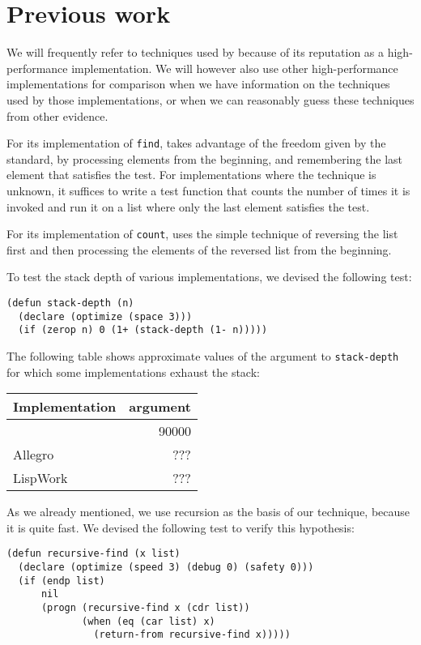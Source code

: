 \section{Previous work}

We will frequently refer to techniques used by \sbcl{} because of its
reputation as a high-performance implementation.  We will however also
use other high-performance implementations for comparison when we have
information on the techniques used by those implementations, or when
we can reasonably guess these techniques from other evidence.

For its implementation of \texttt{find}, \sbcl{} takes advantage of
the freedom given by the standard, by processing elements from the
beginning, and remembering the last element that satisfies the test.
For implementations where the technique is unknown, it suffices to
write a test function that counts the number of times it is invoked
and run it on a list where only the last element satisfies the test.

For its implementation of \texttt{count}, \sbcl{} uses the simple
technique of reversing the list first and then processing the elements
of the reversed list from the beginning.

To test the stack depth of various implementations, we devised the
following test:

{\small\begin{verbatim}
(defun stack-depth (n)
  (declare (optimize (space 3)))
  (if (zerop n) 0 (1+ (stack-depth (1- n)))))
\end{verbatim}}

The following table shows approximate values of the argument to
\texttt{stack-depth} for which some implementations exhaust the stack:


\begin{tabular}{|l|r|}
\hline
Implementation & argument\\
\hline
\hline
\sbcl{} & 90000\\
\hline
Allegro & ???\\
\hline
LispWork & ???\\
\hline
\end{tabular}

As we already mentioned, we use recursion as the basis of our
technique, because it is quite fast.  We devised the following test to
verify this hypothesis:

{\small\begin{verbatim}
(defun recursive-find (x list)
  (declare (optimize (speed 3) (debug 0) (safety 0)))
  (if (endp list)
      nil
      (progn (recursive-find x (cdr list))
             (when (eq (car list) x)
               (return-from recursive-find x)))))
\end{verbatim}}

